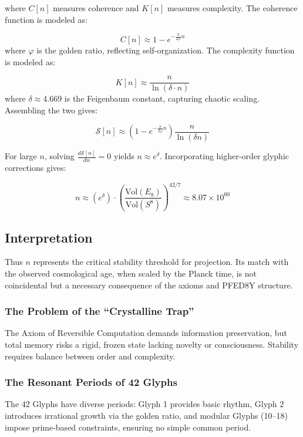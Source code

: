 \documentclass[pdflatex,sn-mathphys-num]{sn-jnl}
\theoremstyle{thmstyleone}
\theoremstyle{thmstyletwo}
\theoremstyle{thmstylethree}
\begin{document}
where $C[n]$ measures coherence and $K[n]$ measures complexity.
The coherence function is modeled as:


\begin{equation}
C[n] \approx 1 - e^{-\frac{\pi}{2\varphi} n}
\end{equation}
where $\varphi$ is the golden ratio, reflecting self-organization.
The complexity function is modeled as:

\begin{equation}
K[n] \approx \frac{n}{\ln(\delta \cdot n)}
\end{equation}
where $\delta \approx 4.669$ is the Feigenbaum constant, capturing chaotic scaling.
Assembling the two gives:

\begin{equation}
\mathcal{S}[n] \approx \left(1 - e^{-\frac{\pi}{2\varphi} n}\right)\frac{n}{\ln(\delta n)}
\end{equation}

For large $n$, solving $\frac{d\mathcal{S}[n]}{dn} = 0$ yields $n \approx e^\delta$. Incorporating higher-order glyphic corrections gives:

\begin{equation}
n \approx \left(e^\delta\right) \cdot \left(\frac{\text{Vol}(E_8)}{\text{Vol}(S^8)}\right)^{42/7} \approx 8.07 \times 10^{60}
\end{equation}

\subsection{Interpretation}\label{subsec:s1-interpretation}
Thus $n$ represents the critical stability threshold for projection. Its match with the observed cosmological age, when scaled by the Planck time, is not coincidental but a necessary consequence of the axioms and PFED8Y structure.

\subsubsection{The Problem of the ``Crystalline Trap''}
The Axiom of Reversible Computation demands information preservation, but total memory risks a rigid, frozen state lacking novelty or consciousness. Stability requires balance between order and complexity.

\subsubsection{The Resonant Periods of 42 Glyphs}
The 42 Glyphs have diverse periods: Glyph 1 provides basic rhythm, Glyph 2 introduces irrational growth via the golden ratio, and modular Glyphs (10--18) impose prime-based constraints, ensuring no simple common period.
\end{document}
